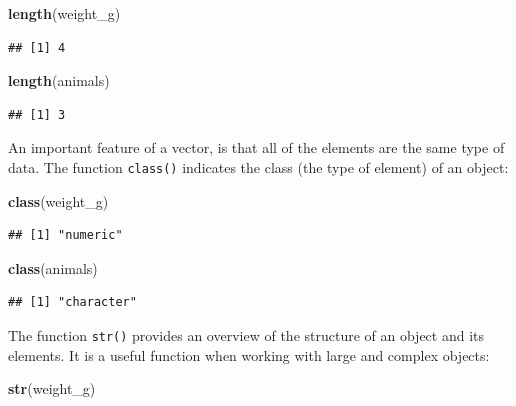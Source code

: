 \documentclass[
]{book}
\newenvironment{Shaded}{\begin{snugshade}}{\end{snugshade}}
\newcommand{\FunctionTok}[1]{\textcolor[rgb]{0.13,0.29,0.53}{\textbf{#1}}}
\newcommand{\NormalTok}[1]{#1}
\begin{document}
\begin{Shaded}
\begin{Highlighting}[]
\FunctionTok{length}\NormalTok{(weight\_g)}
\end{Highlighting}
\end{Shaded}

\begin{verbatim}
## [1] 4
\end{verbatim}

\begin{Shaded}
\begin{Highlighting}[]
\FunctionTok{length}\NormalTok{(animals)}
\end{Highlighting}
\end{Shaded}

\begin{verbatim}
## [1] 3
\end{verbatim}

An important feature of a vector, is that all of the elements are the same type of data. The function \texttt{class()} indicates the class (the type of element) of an object:

\begin{Shaded}
\begin{Highlighting}[]
\FunctionTok{class}\NormalTok{(weight\_g)}
\end{Highlighting}
\end{Shaded}

\begin{verbatim}
## [1] "numeric"
\end{verbatim}

\begin{Shaded}
\begin{Highlighting}[]
\FunctionTok{class}\NormalTok{(animals)}
\end{Highlighting}
\end{Shaded}

\begin{verbatim}
## [1] "character"
\end{verbatim}

The function \texttt{str()} provides an overview of the structure of an object and its elements. It is a useful function when working with large and complex objects:

\begin{Shaded}
\begin{Highlighting}[]
\FunctionTok{str}\NormalTok{(weight\_g)}
\end{Highlighting}
\end{Shaded}
\end{document}
